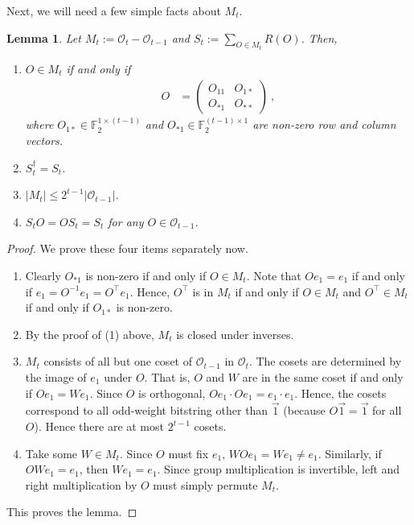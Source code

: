 \documentclass[11pt]{article}
\newtheorem{lemma}[theorem]{Lemma}
\newcommand{\F}{\mathbb{F}}
\newcommand{\Oc}{\mathcal{O}}
\begin{document}
Next, we will need a few simple facts about $M_t$.
\begin{lemma}\label{lem:mt_facts}
    Let $M_t := \Oc_{t}-\Oc_{t-1}$ and $S_t := \sum_{O \in M_t} R(O)$. Then,
    \begin{enumerate}
        \item $O \in M_t$ if and only if 
        \begin{align}
            O & = \begin{pmatrix}
                O_{11} & O_{1*}\\
                O_{*1} & O_{**}
            \end{pmatrix}\ ,
        \end{align}
        where $O_{1*} \in \F_2^{1 \times (t-1)}$ and $O_{*1} \in \F_2^{(t-1)\times 1}$ are non-zero row and column vectors.
        \item $S_t^\dagger = S_t$.
        \item $\vert M_t \vert \leq 2^{t-1}\vert \Oc_{t-1}\vert$.
        \item $S_t O = O S_t = S_t$ for any $O \in \Oc_{t-1}$.
    \end{enumerate}
\end{lemma}
    \begin{proof}We prove these four items separately now.
        \begin{enumerate}
            \item Clearly $O_{*1}$ is non-zero if and only if $O \in M_t$. Note that $Oe_1 = e_1$ if and only if $e_1 = O^{-1}e_1 = O^\top e_1$. Hence, $O^\top$ is in $M_t$ if and only if $O \in M_t$ and $O^\top \in M_t$ if and only if $O_{1*}$ is non-zero.

            \item By the proof of (1) above, $M_t$ is closed under inverses.

            \item $M_t$ consists of all but one coset of $\Oc_{t-1}$ in $\Oc_t$. The cosets are determined by the image of $e_1$ under $O$. That is, $O$ and $W$ are in the same coset if and only if $Oe_1 = We_1$. Since $O$ is orthogonal, $Oe_1 \cdot Oe_1 = e_1 \cdot e_1$. Hence, the cosets correspond to all odd-weight bitstring other than $\vec{1}$ (because $O\vec{1} = \vec{1} $ for all $O$). Hence there are at most $2^{t-1}$ cosets.

            \item Take some $W \in M_t$. Since $O$ must fix $e_1$, $WOe_1 = We_1 \neq e_1$. Similarly, if $OWe_1 = e_1$, then $We_1 = e_1$. Since group multiplication is invertible, left and right multiplication by $O$ must simply permute $M_t$.
        \end{enumerate}
        This proves the lemma.
    \end{proof}
\end{document}
